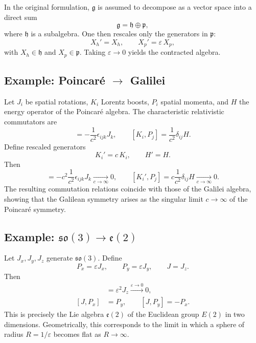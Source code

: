 In the original formulation, $\mathfrak{g}$ is assumed to decompose as a vector
space into a direct sum
\begin{equation}
    \mathfrak{g} = \mathfrak{h} \oplus \mathfrak{p},
\end{equation}
where $\mathfrak{h}$ is a subalgebra.  One then rescales only the generators in
$\mathfrak{p}$:
\begin{equation}
   X_h' = X_h, \qquad
   X_p' = \varepsilon\, X_p,
\end{equation}
with $X_h \in \mathfrak{h}$ and $X_p \in \mathfrak{p}$.
Taking $\varepsilon \to 0$ yields the contracted algebra.

\subsection{Example: Poincar\'e \texorpdfstring{$\to$}{→} Galilei}

Let $J_i$ be spatial rotations, $K_i$ Lorentz boosts, $P_i$ spatial momenta,
and $H$ the energy operator of the Poincar\'e algebra.  The characteristic
relativistic commutators are
\begin{equation}
   [K_i,K_j] = - \frac{1}{c^2} \epsilon_{ijk} J_k,
   \qquad
   [K_i,P_j] = \frac{1}{c^2} \delta_{ij} H.
\end{equation}
Define rescaled generators
\begin{equation}
    K_i' = c\, K_i, \qquad H' = H.
\end{equation}
Then
\begin{equation}
   [K_i',K_j'] = - c^2 \frac{1}{c^2} \epsilon_{ijk} J_k
      \xrightarrow[c\to\infty]{} 0, 
   \qquad
   [K_i',P_j] = c \frac{1}{c^2} \delta_{ij} H
      \xrightarrow[c\to\infty]{} 0 .
\end{equation}
The resulting commutation relations coincide with those of the Galilei algebra,
showing that the Galilean symmetry arises as the singular limit $c\to\infty$
of the Poincar\'e symmetry.

\subsection{Example: \texorpdfstring{$\mathfrak{so}(3) \to \mathfrak{e}(2)$}{so(3)→e(2)}}

Let $J_x,J_y,J_z$ generate $\mathfrak{so}(3)$.  Define
\begin{equation}
    P_x = \varepsilon J_x, \qquad
    P_y = \varepsilon J_y, \qquad
    J = J_z.
\end{equation}
Then
\begin{align}
    [P_x,P_y] &= \varepsilon^2 J_z \xrightarrow{\varepsilon\to 0} 0, \\
    [J,P_x] &= P_y, \qquad [J,P_y] = - P_x.
\end{align}
This is precisely the Lie algebra $\mathfrak{e}(2)$ of the Euclidean group
$E(2)$ in two dimensions.  Geometrically, this corresponds to the limit in
which a sphere of radius $R = 1/\varepsilon$ becomes flat as $R\to\infty$.


